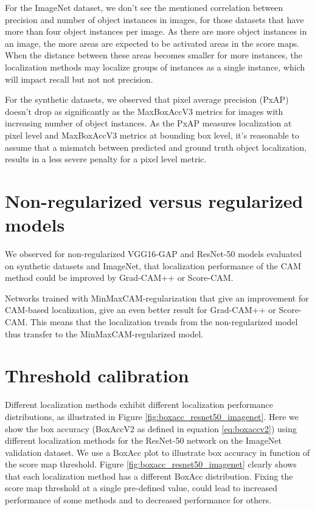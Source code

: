 For the ImageNet dataset, we don't see the mentioned correlation between precision and number of object instances in images, for those datasets that have more than four object instances per image. As there are more object instances in an image, the more areas are expected to be activated areas in the score maps. When the distance between these areas becomes smaller for more instances, the localization methods may localize groups of instances as a single instance, which will impact recall but not not precision.

For the synthetic datasets, we observed that pixel average precision (PxAP) doesn’t drop as significantly as the MaxBoxAccV3 metrics for images with increasing number of object instances. As the PxAP measures localization at pixel level and MaxBoxAccV3 metrics at bounding box level, it's reasonable to assume that a mismatch between predicted and ground truth object localization, results in a less severe penalty for a pixel level metric.

\section{Non-regularized versus regularized models}
We observed for non-regularized VGG16-GAP and ResNet-50 models evaluated on synthetic datasets and ImageNet, that localization performance of the CAM method could be improved by Grad-CAM++ or Score-CAM.

Networks trained with MinMaxCAM-regularization that give an improvement for CAM-based localization, give an even better result for Grad-CAM++ or Score-CAM. This means that the localization trends from the non-regularized model thus transfer to the MinMaxCAM-regularized model.

\section{Threshold calibration}
Different localization methods exhibit different localization performance distributions, as illustrated in Figure \ref{fig:boxacc_resnet50_imagenet}. Here we show the box accuracy (BoxAccV2 as defined in equation \ref{eq:boxaccv2}) using different localization methods for the ResNet-50 network on the ImageNet validation dataset. We use a BoxAcc plot to illustrate box accuracy in function of the score map threshold. Figure \ref{fig:boxacc_resnet50_imagenet} clearly shows that each localization method has a different BoxAcc distribution. Fixing the score map threshold at a single pre-defined value, could lead to increased performance of some methods and to decreased performance for others. 

